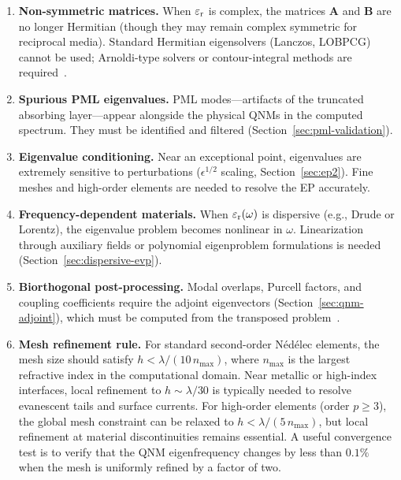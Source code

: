 \begin{enumerate}
 \item \textbf{Non-symmetric matrices.} When $\varepsilon_{\mathrm{r}}$ is complex, the
 matrices $\mathbf{A}$ and $\mathbf{B}$ are no longer Hermitian
 (though they may remain complex symmetric for reciprocal media).
 Standard Hermitian eigensolvers (Lanczos, LOBPCG) cannot be used;
 Arnoldi-type solvers or contour-integral methods are
 required~\cite{wu2026rigorous}.

 \item \textbf{Spurious PML eigenvalues.} PML modes---artifacts of the
 truncated absorbing layer---appear alongside the physical QNMs in
 the computed spectrum. They must be identified and filtered
 (Section~\ref{sec:pml-validation}).

 \item \textbf{Eigenvalue conditioning.} Near an exceptional point,
 eigenvalues are extremely sensitive to perturbations
 ($\epsilon^{1/2}$ scaling, Section~\ref{sec:ep2}). Fine meshes and
 high-order elements are needed to resolve the EP accurately.

 \item \textbf{Frequency-dependent materials.} When $\varepsilon_{\mathrm{r}}(\omega)$
 is dispersive (e.g., Drude or Lorentz), the eigenvalue problem
 becomes nonlinear in $\omega$. Linearization through auxiliary
 fields or polynomial eigenproblem formulations is needed
 (Section~\ref{sec:dispersive-evp}).

 \item \textbf{Biorthogonal post-processing.} Modal overlaps, Purcell
 factors, and coupling coefficients require the adjoint eigenvectors
 (Section~\ref{sec:qnm-adjoint}), which must be computed from the
 transposed problem~\cite{vial2014quasimodal}.

 \item \textbf{Mesh refinement rule.} For standard second-order
 N\'ed\'elec elements, the mesh size should satisfy
 $h < \lambda/(10\,n_{\max})$, where $n_{\max}$ is the largest
 refractive index in the computational domain. Near metallic
 or high-index interfaces, local refinement to $h \sim \lambda/30$
 is typically needed to resolve evanescent tails and surface currents.
 For high-order elements (order $p \ge 3$), the global mesh
 constraint can be relaxed to $h < \lambda/(5\,n_{\max})$, but local
 refinement at material discontinuities remains essential. A useful
 convergence test is to verify that the QNM eigenfrequency changes by
 less than $0.1\%$ when the mesh is uniformly refined by a factor of
 two.
\end{enumerate}

